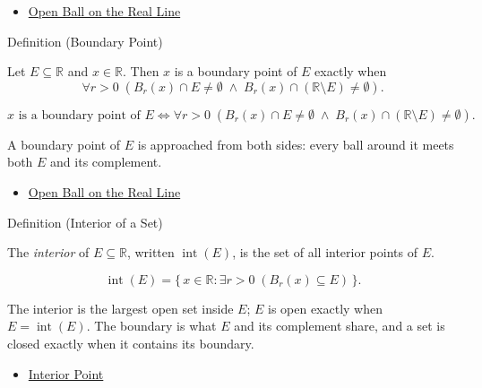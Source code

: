 \begin{dependencies}
\begin{itemize}
  \item \hyperref[def:open-ball]{Open Ball on the Real Line}
\end{itemize}
\end{dependencies}
\begin{definitionbox}{Definition (Boundary Point)}
\begin{definition}
\label{def:boundary-point}
Let $E\subseteq\mathbb{R}$ and $x\in\mathbb{R}$. Then $x$ is a boundary point of $E$ exactly when
\[
\forall r>0\;(B_{r}(x)\cap E\neq\emptyset \;\land\; B_{r}(x)\cap(\mathbb{R}\setminus E)\neq\emptyset).
\]
\end{definition}
\end{definitionbox}
\begin{remark*}
\[
x \text{ is a boundary point of } E \Longleftrightarrow \forall r>0\;(B_{r}(x)\cap E\neq\emptyset \;\land\; B_{r}(x)\cap(\mathbb{R}\setminus E)\neq\emptyset).
\]
\end{remark*}
\begin{remark*}[Interpretation]
A boundary point of $E$ is approached from both sides: every ball around it meets both $E$ and its complement.
\end{remark*}
\begin{dependencies}
\begin{itemize}
  \item \hyperref[def:open-ball]{Open Ball on the Real Line}
\end{itemize}
\end{dependencies}
\begin{definitionbox}{Definition (Interior of a Set)}
\begin{definition}
\label{def:interior-of-set}
The \emph{interior} of $E\subseteq\mathbb{R}$, written $\operatorname{int}(E)$, is the set of all interior points of $E$.
\end{definition}
\end{definitionbox}
\begin{remark*}
\[
\operatorname{int}(E)=\{\,x\in\mathbb{R}: \exists r>0\;(B_r(x)\subseteq E)\,\}.
\]
\end{remark*}
\begin{remark*}[Interpretation]
The interior is the largest open set inside $E$; $E$ is open exactly when $E=\operatorname{int}(E)$. The boundary is what $E$ and its complement share, and a set is closed exactly when it contains its boundary.
\end{remark*}
\begin{dependencies}
\begin{itemize}
  \item \hyperref[def:interior-point]{Interior Point}
\end{itemize}
\end{dependencies}
